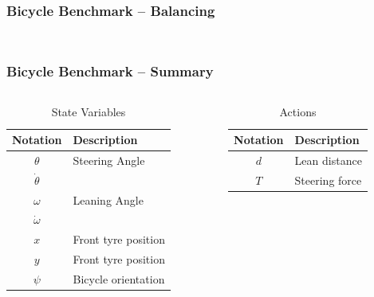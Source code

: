 \begin{frame}[label=bicycle_balance]
    \frametitle{Bicycle Benchmark -- Balancing}

    \vfill
    \begin{columns}
        \begin{column}{0.45\textwidth}
            \centering
            
        \end{column}
        \begin{column}{0.55\textwidth}
            \centering
             {
            }
        \end{column}
    \end{columns}
\end{frame}

\begin{frame}[label=bicycle_summary]
    \frametitle{Bicycle Benchmark -- Summary}

    \centering
    \begin{columns}[t]
        \begin{column}{.4\textwidth}
            \begin{table}
                \caption{State Variables}
                \begin{tabularx}{\textwidth}{cX}
                    \toprule
                    Notation & Description \\
                    \midrule
                    $\theta$ & Steering Angle \\
                    $\dot{\theta}$ &  \\
                    $\omega$ & Leaning Angle \\
                    $\dot{\omega}$ &  \\
                    $x$ & Front tyre position \\
                    $y$ & Front tyre position \\
                    $\psi$ & Bicycle orientation \\
                    \bottomrule
                \end{tabularx}
            \end{table}
        \end{column}
        \begin{column}{.4\textwidth}
            \begin{table}
                \caption{Actions}
                \begin{tabularx}{\textwidth}{cX}
                    \toprule
                    Notation & Description \\
                    \midrule
                    $d$ & Lean distance \\
                    $T$ & Steering force \\
                    \bottomrule
                \end{tabularx}
            \end{table}
        \end{column}
    \end{columns}
\end{frame}

